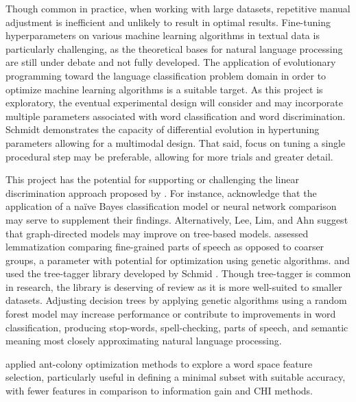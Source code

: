\documentclass{article}
\begin{document}
Though common in practice, when working with large datasets, repetitive manual adjustment is inefficient and unlikely to result in optimal results. Fine-tuning hyperparameters on various machine learning algorithms in textual data is particularly challenging, as the theoretical bases for natural language processing are still under debate and not fully developed. The application of evolutionary programming toward the language classification problem domain in order to optimize machine learning algorithms is a suitable target. As this project is exploratory, the eventual experimental design will consider and may incorporate multiple parameters associated with word classification and word discrimination. Schmidt \citep{schmidt2019performance} demonstrates the capacity of differential evolution in hypertuning parameters allowing for a multimodal design. That said, focus on tuning a single procedural step may be preferable, allowing for more trials and greater detail.

This project has the potential for supporting or challenging the linear discrimination approach proposed by \citep{baayen2019discriminative}. For instance, \citep{baayen2019discriminative} acknowledge that the application of a naïve Bayes classification model or neural network comparison may serve to supplement their findings. Alternatively, Lee, Lim, and Ahn \citep{lee2019automotive} suggest that graph-directed models may improve on tree-based models. \cite{gleim2019practitioner} assessed lemmatization comparing fine-grained parts of speech as opposed to coarser groups, a parameter with potential for optimization using genetic algorithms. \citep{baayen2019discriminative} and \citep{buchanan_dedeyne_montefinese_2019} used the tree-tagger library developed by Schmid \citep{schmid1994probabilistic, schmid1999improvements}. Though tree-tagger is common in research, the library is deserving of review as it is more well-suited to smaller datasets. Adjusting decision trees by applying genetic algorithms using a random forest model may increase performance or contribute to improvements in word classification, producing stop-words, spell-checking, parts of speech, and semantic meaning most closely approximating natural language processing. 

\citet*{aghdam2009text} applied ant-colony optimization methods to explore a word space feature selection, particularly useful in defining a minimal subset with suitable accuracy, with fewer features in comparison to information gain and CHI methods. 
\end{document}
